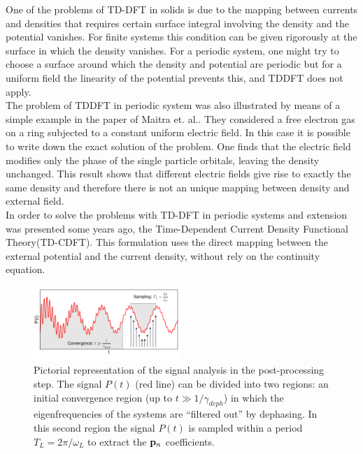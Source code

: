One of the problems of TD-DFT in solids is due to the mapping between currents and densities that requires certain surface integral involving the density and the potential vanishes. For finite systems this condition  can be given rigorously at the surface in which the density vanishes. For a periodic system, one might try to choose a surface around which the density and potential are periodic but for a uniform field the linearity of the potential prevents this, and TDDFT does not apply.\cite{Gonze1995} \\
The problem of TDDFT in periodic system was also illustrated  by means of a simple example in the paper of Maitra et. al.\cite{maitra2003current}. They considered a free electron gas on a ring subjected to a constant uniform electric field. In this case it is possible to write down the exact solution of the problem. One finds that the electric field modifies only the phase of the single particle orbitals, leaving the density unchanged. This result shows that different electric fields  give rise to exactly the same density and therefore there is not an unique mapping between density and external field.\\
In order to solve the problems with TD-DFT in periodic systems and extension was presented some years ago, the Time-Dependent Current Density Functional Theory(TD-CDFT)\cite{PhysRevA.38.1149}. This formulation uses the direct mapping between the external potential and the current density, without rely on the continuity equation.\\
\begin{figure}
	\includegraphics[width=0.5\textwidth]{Figures/Pt_analysis}
\caption{\footnotesize{Pictorial representation of the signal analysis in the post-processing step. The signal  $P(t)$ (red line) can be divided into two regions: an initial convergence region (up to $t\gg 1/\gamma_{deph}$) in which the eigenfrequencies of the systems are ``filtered out'' by dephasing. In this second region the signal $P(t)$ is sampled within a period $T_L=2\pi/\omega_L$ to extract the ${\bf p}_n$ coefficients. %
	\label{fg:ptanalysis} }} 
\end{figure}

